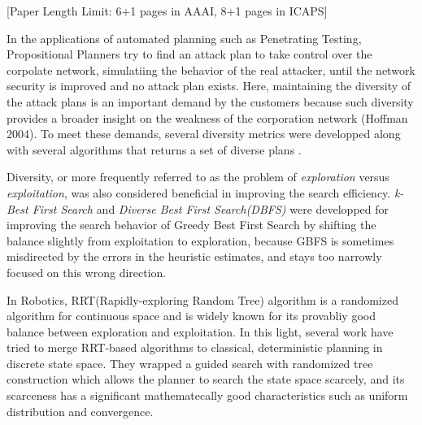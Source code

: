 
\begin{abstract}
Maintaining the diversity in the results of heuristic search has been an
important requirement in the applications of automated planning such as
Penetrating Testing.
Despite the common-sense notion of diversity that it provides a new
perspective and better understanding of the world, little has been investigated on the
benefit of diversity when applied to the admissible search algorithms in terms of search efficiency.
In this paper, we propose a novel 
diversified tie-breaking method for A* 
which tries to expand the dissimilar branches as much as possible,
maintaining the admissibility of the search.
\end{abstract}

[Paper Length Limit: 6+1 pages in AAAI, 8+1 pages in ICAPS]

In the applications of automated planning such as Penetrating Testing, Propositional Planners try to find an attack plan to take control over the corpolate network, simulatiing the behavior of the real attacker, until the network security is improved and no attack plan exists.  Here, maintaining the diversity of the attack plans is an important demand by the customers because such diversity provides a broader insight on the weakness of the corporation network (Hoffman 2004). To meet these demands, several diversity metrics were developped \cite{roberts2014evaluating,goldman2015measuring} along with several algorithms that returns a set of diverse plans \cite{srivastava2007domain,coman2011generating,nguyen2012generating}.

Diversity, or more frequently referred to as the problem of \emph{exploration} versus
\emph{exploitation}, was also considered beneficial in improving the search efficiency.
\emph{k-Best First Search} \cite{felner2003kbfs} and \emph{Diverse Best First Search(DBFS)}
\cite{imai2011novel} were developped for
improving the search behavior of Greedy Best First Search by shifting the
balance slightly from exploitation to exploration, because GBFS
is sometimes misdirected by the errors in the heuristic estimates,
and stays too narrowly focused on this wrong direction.

In Robotics, RRT(Rapidly-exploring Random Tree) algorithm is a randomized algorithm for continuous space and is widely known for its provabliy good balance between exploration and exploitation. In this light, several work \cite{alcazar2011adapting,burfoot2006rrt,likhachev2008r} have tried to merge RRT-based algorithms to classical, deterministic planning in discrete state space. They wrapped a guided search with randomized tree construction which allows the planner to search the state space scarcely, and its scarceness has a significant mathematecally good characteristics such as uniform distribution and convergence.


